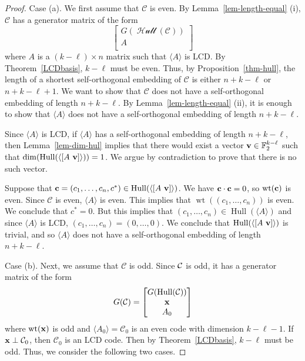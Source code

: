 \documentclass{article}
\theoremstyle{definition}
\theoremstyle{remark}
\newcommand{\C}{\mbox{$\cal C$}}
\newcommand{\Hull}{\operatorname{Hull}}
\newcommand{\wt}{\operatorname{wt}}
\begin{document}
\begin{proof}
Case (a). We first assume that $\mathcal{C}$ is even. By Lemma~\ref{lem-length-equal} (i), $\mathcal C$ has a generator matrix of the form
\[
\begin{bmatrix}
G(\mathcal {\operatorname{Hull}}(\mathcal C))  \\
A  \\
\end{bmatrix}
\]
where $A$ is a $(k -\ell) \times n$ matrix such that $\langle A\rangle$ is LCD. By Theorem~\ref{LCDbasis}, $k-\ell$ must be even. Thus, by Proposition~\ref{thm-hull}, the length of a shortest self-orthogonal embedding of $\mathcal C$ is either $n+k-\ell$ or $n+k-\ell +1$.
We want to show that $\mathcal C$ does not have a self-orthogonal embedding of length $n+k -\ell$. By Lemma~\ref{lem-length-equal} (ii), it is enough to show that $\langle A\rangle$ does not have a self-orthogonal embedding of length $n + k -\ell$.

Since $\langle A\rangle$ is LCD, if $\langle A\rangle$ has a self-orthogonal embedding of length $n+k - \ell$, then Lemma~\ref{lem-dim-hul} implies that there would exist a vector ${\bf{v}} \in \mathbb F_2^{k-\ell}$ such that $\dim(\Hull(\langle[A ~{\bf{v}}]\rangle)) =1$.  We argue by contradiction to prove that there is no such vector.

Suppose that ${\bf{c}}=(c_1, \dots, c_n, c^*) \in {\rm{Hull}}(\langle[A ~{\bf{v}}]\rangle)$.  We have ${\bf{c}}\cdot {\bf{c}} = 0$, so $\wt({\bf{c}})$ is even.  Since $\mathcal C$ is even, $\langle A \rangle$ is even. This implies that $\wt((c_1,\ldots, c_n))$ is even.  We conclude that $c^* =0$. But this implies that $(c_1, \dots, c_n)  \in \Hull(\langle A \rangle)$ and since $\langle A \rangle$ is LCD, $(c_1, \dots, c_n) =(0, \dots, 0)$.  We conclude that $\Hull(\langle[A ~ {\bf{v}}]\rangle)$ is trivial, and so $\langle A \rangle$ does not have a self-orthogonal embedding of length $n+k -\ell$.

Case (b). Next, we assume that $\mathcal{C}$ is odd. Since $\C$ is odd, it has a generator matrix of the form
\[
G(\mathcal C) = \begin{bmatrix}
G({\mbox{{\rm{Hull}}}}(\mathcal C)) \\
{\bf{x}} \\
A_0   \\
\end{bmatrix}
\]
where $\wt({\bf{x}})$ is odd and $\langle A_0\rangle = \mathcal C_0$ is an even code with dimension $k -\ell -1$. If ${\bf{x}} \perp \mathcal C_0$, then $\mathcal{C}_0$ is an LCD code. Then by Theorem~\ref{LCDbasis}, $k-\ell$ must be odd. Thus, we consider the following two cases.


\end{proof}
\end{document}
